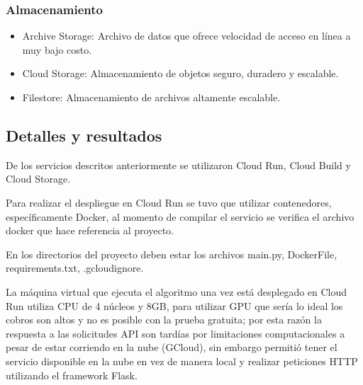 \documentclass[../Main.tex]{subfiles}
\begin{document}
    \subsubsection{Almacenamiento}
    \begin{itemize}
        \item Archive Storage: Archivo de datos que ofrece velocidad de acceso en línea a muy bajo costo.
        \item Cloud Storage: Almacenamiento de objetos seguro, duradero y escalable.
        \item Filestore: Almacenamiento de archivos altamente escalable.
    \end{itemize}
    
    \subsection{Detalles y resultados}
    \begin{justify}
    De los servicios descritos anteriormente se utilizaron Cloud Run, Cloud Build y Cloud Storage.
    
    Para realizar el despliegue en Cloud Run se tuvo que utilizar contenedores, específicamente Docker, al momento de compilar el servicio se verifica el archivo docker que hace referencia al proyecto.
    
    En los directorios del proyecto deben estar los archivos main.py, DockerFile, requirements.txt, .gcloudignore.
    
    La máquina virtual que ejecuta el algoritmo una vez está desplegado en Cloud Run utiliza CPU de 4 núcleos y 8GB, para utilizar GPU que sería lo ideal los cobros son altos y no es posible con la prueba gratuita; por esta razón la respuesta a las solicitudes API son tardías por limitaciones computacionales a pesar de estar corriendo en la nube (GCloud), sin embargo permitió tener el servicio disponible en la nube en vez de manera local y realizar peticiones HTTP utilizando el framework Flask.
    \end{justify}
    
\end{document}
